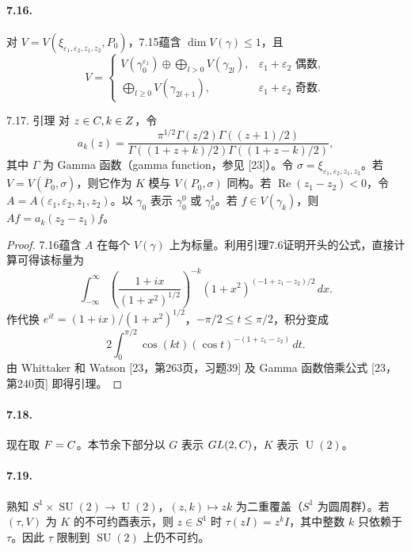 \paragraph*{7.16.} 对 $V=V(\xi_{\varepsilon_1,\varepsilon_2,z_1,z_2},P_0)$，7.15蕴含 $\dim V(\gamma)\le1$，且
\[
 V=\begin{cases}
 V(\gamma_0^{\varepsilon_1})\oplus\displaystyle\bigoplus_{l>0}V(\gamma_{2l}),&\varepsilon_1+\varepsilon_2\text{ 偶数},\\
 \displaystyle\bigoplus_{l\ge0}V(\gamma_{2l+1}),&\varepsilon_1+\varepsilon_2\text{ 奇数}.
 \end{cases}
\]
\begin{originaltheorem}{7.17. 引理}
对 $z\in C,k\in Z$，令
\[
 a_k(z)=\frac{\pi^{1/2}\Gamma(z/2)\Gamma((z+1)/2)}
 {\Gamma((1+z+k)/2)\Gamma((1+z-k)/2)},
\]
其中 $\Gamma$ 为 Gamma 函数（gamma function，参见 [23]）。令 $\sigma=\xi_{\varepsilon_1,\varepsilon_2,z_1,z_2}$。若 $V=V(\overline P_0,\sigma)$，则它作为 $K$ 模与 $V(P_0,\sigma)$ 同构。若 $\operatorname{Re}(z_1-z_2)<0$，令 $A=A(\varepsilon_1,\varepsilon_2,z_1,z_2)$。以 $\gamma_0$ 表示 $\gamma_0^0$ 或 $\gamma_0^1$。若 $f\in V(\gamma_k)$，则 $Af=a_k(z_2-z_1)f$。
\end{originaltheorem}
\begin{proof}
7.16蕴含 $A$ 在每个 $V(\gamma)$ 上为标量。利用引理7.6证明开头的公式，直接计算可得该标量为
\begin{equation}
 \int_{-\infty}^{\infty}\left(\frac{1+ix}{(1+x^2)^{1/2}}\right)^{-k}
 (1+x^2)^{(-1+z_1-z_2)/2}\,dx.
 \tag{1}
\end{equation}
作代换 $e^{it}=(1+ix)/(1+x^2)^{1/2}$，$-\pi/2\le t\le\pi/2$，积分变成
\begin{equation}
 2\int_0^{\pi/2}\cos(kt)(\cos t)^{-(1+z_1-z_2)}\,dt.
 \tag{2}
\end{equation}
由 Whittaker 和 Watson [23，第263页，习题39] 及 Gamma 函数倍乘公式 [23，第240页] 即得引理。
\end{proof}
\paragraph*{7.18.} 现在取 $F=C$。本节余下部分以 $G$ 表示 $GL(2,C)$，$K$ 表示 $\operatorname U(2)$。
\paragraph*{7.19.} 熟知 $S^1\times\operatorname{SU}(2)\to\operatorname U(2)$，$(z,k)\mapsto zk$ 为二重覆盖（$S^1$ 为圆周群）。若 $(\tau,V)$ 为 $K$ 的不可约酉表示，则 $z\in S^1$ 时 $\tau(zI)=z^kI$，其中整数 $k$ 只依赖于 $\tau$。因此 $\tau$ 限制到 $\operatorname{SU}(2)$ 上仍不可约。

